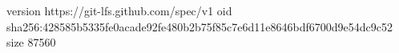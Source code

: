 version https://git-lfs.github.com/spec/v1
oid sha256:428585b5335fe0acade92fe480b2b75f85c7e6d11e8646bdf6700d9e54dc9c52
size 87560
